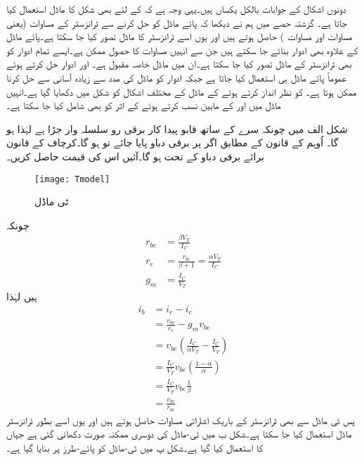 دونوں اشکال کے جوابات بالکل یکساں ہیں۔یہی وجہ ہے کہ  کے لئے بھی شکل  کا ماڈل استعمال کیا جاتا ہے۔
 
گزشتہ حصے میں ہم نے دیکھا کہ پائے ماڈل کو حل کرنے سے ٹرانزسٹر کے مساوات (یعنی مساوات   اور مساوات  ) حاصل ہوتے ہیں اور یوں اسے ٹرانزسٹر کا ماڈل تصور کیا جا سکتا ہے۔پائے ماڈل کے علاوہ بھی ادوار بنائے جا سکتے ہیں جن سے انہیں مساوات کا حصول ممکن ہے۔ایسے تمام ادوار کو بھی ٹرانزسٹر کے ماڈل تصور کیا جا سکتا ہے۔ان میں  ماڈل خاصہ مقبول ہے۔ اور   ادوار حل کرتے ہوئے عموماً پائے ماڈل ہی استعمال کیا جاتا ہے جبکہ  ادوار کو  ماڈل کی مدد سے زیادہ آسانی سے حل کرنا ممکن ہوتا ہے۔ کو نظر انداز کرتے ہوئے   کے  ماڈل کے مختلف اشکال کو شکل  میں دکھایا گیا ہے۔انہیں ماڈل میں  اور  کے مابین  نسب کرتے ہوئے  کے اثر کو بھی شامل کیا جا سکتا ہے۔

شکل  الف میں چونکہ  سرے کے ساتھ قابو پیدا کار برقی رو سلسلہ وار جڑا ہے لہٰذا   ہو گا۔ اُوہم کے قانون کے مطابق اگر   پر  برقی دباو پایا جائے تو   ہو گا۔کرچاف کے قانون برائے برقی دباو کے تحت  ہو گا۔آئیں اس کی قیمت حاصل کریں۔
\begin{figure}
\centering
\texttt{[image: Tmodel]}
\caption{ٹی ماڈل}
\label{شکل_ٹی_ماڈل}
\end{figure}
	چونکہ
\begin{align*}
r_{be}&=\frac{\beta V_T}{I_C}\\
r_e &=\frac{r_{be}}{\beta+1}=\frac{\alpha V_T}{I_C}\\
g_m &=\frac{I_C}{V_T}
\end{align*}
ہیں لہٰذا
\begin{align*}
i_b&=i_e-i_c\\
&=\frac{v_{be}}{r_e}-g_m v_{be}\\
&=v_{be} \left (\frac{I_C}{\alpha V_T} - \frac{I_C}{V_T} \right )\\
&=\frac{I_C}{V_T} v_{be} \left(\frac{1-\alpha}{\alpha} \right )\\
&=\frac{I_C}{V_T} v_{be} \frac{1}{\beta}\\
&=\frac{v_{be}}{r_{be}}
\end{align*}
پس ٹی   ماڈل سے بھی ٹرانزسٹر کے باریک اشاراتی مساوات حاصل ہوتے ہیں اور یوں اسے بطور ٹرانزسٹر ماڈل استعمال کیا جا سکتا ہے۔شکل  ب میں ٹی-ماڈل کی دوسری ممکنہ صورت دکھائی گئی ہے جہاں  کا استعمال کیا گیا ہے۔شکل  پ میں ٹی-ماڈل کو پائے-طرز پر بنایا گیا ہے۔

